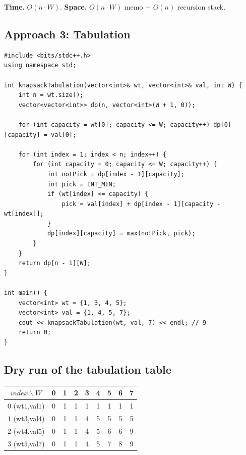 \begin{complexitybox}
\textbf{Time.} $O(n \cdot W)$.
\textbf{Space.} $O(n \cdot W)$ memo $+$ $O(n)$ recursion stack.
\end{complexitybox}

\subsection*{Approach 3: Tabulation}

\begin{lstlisting}
#include <bits/stdc++.h>
using namespace std;

int knapsackTabulation(vector<int>& wt, vector<int>& val, int W) {
    int n = wt.size();
    vector<vector<int>> dp(n, vector<int>(W + 1, 0));

    for (int capacity = wt[0]; capacity <= W; capacity++) dp[0][capacity] = val[0];

    for (int index = 1; index < n; index++) {
        for (int capacity = 0; capacity <= W; capacity++) {
            int notPick = dp[index - 1][capacity];
            int pick = INT_MIN;
            if (wt[index] <= capacity) {
                pick = val[index] + dp[index - 1][capacity - wt[index]];
            }
            dp[index][capacity] = max(notPick, pick);
        }
    }
    return dp[n - 1][W];
}

int main() {
    vector<int> wt = {1, 3, 4, 5};
    vector<int> val = {1, 4, 5, 7};
    cout << knapsackTabulation(wt, val, 7) << endl; // 9
    return 0;
}
\end{lstlisting}

\subsection*{Dry run of the tabulation table}


\begin{center}
\begin{tabular}{c|cccccccc}
$\textit{index}\backslash W$ & 0 & 1 & 2 & 3 & 4 & 5 & 6 & 7 \\ \hline
$0$ (wt$1$,val$1$) & 0 & 1 & 1 & 1 & 1 & 1 & 1 & 1 \\
$1$ (wt$3$,val$4$) & 0 & 1 & 1 & 4 & 5 & 5 & 5 & 5 \\
$2$ (wt$4$,val$5$) & 0 & 1 & 1 & 4 & 5 & 6 & 6 & 9 \\
$3$ (wt$5$,val$7$) & 0 & 1 & 1 & 4 & 5 & 7 & 8 & 9
\end{tabular}
\end{center}

